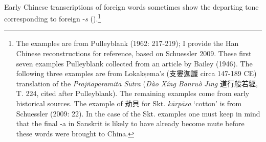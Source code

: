 \paragraph{} 
\label{origins-of-the-tones-and-final-clusters}
Early Chinese transcriptions of foreign words sometimes show the
departing tone cor­re­spond­ing to foreign -\emph{s} ().\footnote{The
  examples are from Pulleyblank (1962: 217-219); I provide the Han
  Chinese reconstructions for reference, based on Schuessler 2009. These
  first seven examples Pulleyblank collected from an article by Bailey
  (1946). The following three examples are from Lokakṣema's (支婁迦讖
  circa 147-189 CE) translation of the \emph{Prajñāpāramitā Sūtra}
  (\emph{Dào Xíng Bānruò Jīng} 道行般若經, T. 224, cited after
  Pulleyblank). The remaining examples come from early historical
  sources. The example of 劫貝 for Skt.  \emph{kārpāsa} `cotton' is from
  Schuessler (2009: 22). In the case of the Skt. examples one must keep
  in mind that the final -a in Sanskrit is likely to have already become
  mute before these words were brought to China. } 
  
